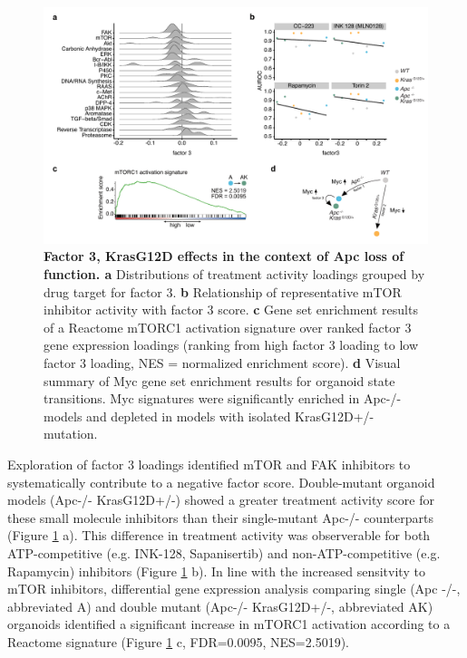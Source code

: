 \begin{flushleft}
\begin{figure}[h]
\centering
\includegraphics[scale=0.75,
                keepaspectratio]{figures/adenomaprofiling/pdf/fig_4_1.pdf}
\caption{\textbf{Factor 3, KrasG12D effects in the context of Apc loss of function. a} Distributions of treatment activity loadings grouped by drug target for factor 3. \textbf{b} Relationship of representative mTOR inhibitor activity with factor 3 score. \textbf{c} Gene set enrichment results of a Reactome mTORC1 activation signature over ranked factor 3 gene expression loadings (ranking from high factor 3 loading to low factor 3 loading, NES = normalized enrichment score). \textbf{d} Visual summary of Myc gene set enrichment results for organoid state transitions. Myc signatures were significantly enriched in Apc-/- models and depleted in models with isolated KrasG12D+/- mutation.}
\label{fig_300}
\end{figure}
\bigbreak

Exploration of factor 3 loadings identified mTOR and FAK inhibitors to systematically contribute to a negative factor score. Double-mutant organoid models (Apc-/- KrasG12D+/-) showed a greater treatment activity score for these small molecule inhibitors than their single-mutant Apc-/- counterparts (Figure \ref{fig_300} a). This difference in treatment activity was observerable for both ATP-competitive (e.g. INK-128, Sapanisertib) and non-ATP-competitive (e.g. Rapamycin) inhibitors (Figure \ref{fig_300} b). In line with the increased sensitvity to mTOR inhibitors, differential gene expression analysis comparing single (Apc -/-, abbreviated A) and double mutant (Apc-/- KrasG12D+/-, abbreviated AK) organoids identified a significant increase in mTORC1 activation according to a Reactome signature (Figure \ref{fig_300} c, FDR=0.0095, NES=2.5019). 


\end{flushleft}
